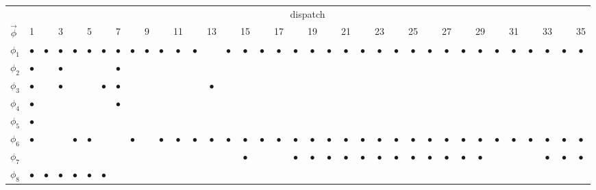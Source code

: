 {\renewcommand{\arraystretch}{0.8} \renewcommand{\tabcolsep}{0.05cm} 
\begin{tabularx}{.9\columnwidth}{|X|ccccccccccccccccccccccccccccccccccc|}
\hline\hline
  & \multicolumn{35}{c|}{dispatch} \\ 
$\vec{\phi} $ & 1 & & 3 &  & 5  &  & 7 &  & 9 &   &11 & &13 & & 15  & &17 & &19 &   &21 & &23 & &25 & &27 & &29 &   &31 & &33 & & 35 \\ \hline 
$\phi_1$& $\bullet$ & $\bullet$ & $\bullet$ & $\bullet$ & $\bullet$ & $\bullet$ & $\bullet$ & $\bullet$ & $\bullet$ & $\bullet$ & $\bullet$ & $\bullet$ &   & $\bullet$ & $\bullet$ & $\bullet$ & $\bullet$ & $\bullet$ & $\bullet$ & $\bullet$ & $\bullet$ & $\bullet$ & $\bullet$ & $\bullet$ & $\bullet$ & $\bullet$ & $\bullet$ & $\bullet$ & $\bullet$ & $\bullet$ & $\bullet$ & $\bullet$ & $\bullet$ & $\bullet$ & $\bullet$ \\
$\phi_2$ & $\bullet$ &   & $\bullet$ &   &   &   & $\bullet$ &   &   &   &   &   &   &   &   &   &   &   &   &   &   &   &   &   &   &   &   &   &   &   &   &   &   &   &   \\
$\phi_3$ & $\bullet$ &   & $\bullet$ &   &   & $\bullet$ & $\bullet$ &   &   &   &   &   & $\bullet$ &   &   &   &   &   &   &   &   &   &   &   &   &   &   &   &   &   &   &   &   &   &  \\
$\phi_4$ & $\bullet$ &   &   &   &   &   & $\bullet$ &   &   &   &   &   &   &   &   &   &   &   &   &   &   &   &   &   &   &   &   &   &   &   &   &   &   &   &  \\
$\phi_5$ & $\bullet$ &   &   &   &   &   &   &   &   &   &   &   &   &   &   &   &   &   &   &   &   &   &   &   &   &   &   &   &   &   &   &   &   &   &  \\
$\phi_6$ & $\bullet$ &   &   & $\bullet$ & $\bullet$ &   &   & $\bullet$ &   & $\bullet$ & $\bullet$ & $\bullet$ & $\bullet$ & $\bullet$ & $\bullet$ & $\bullet$ & $\bullet$ & $\bullet$ & $\bullet$ & $\bullet$ & $\bullet$ & $\bullet$ & $\bullet$ & $\bullet$ & $\bullet$ & $\bullet$ & $\bullet$ & $\bullet$ & $\bullet$ & $\bullet$ & $\bullet$ & $\bullet$ & $\bullet$ & $\bullet$ & $\bullet$ \\
$\phi_7$ &   &   &   &   &   &   &   &   &   &   &   &   &   &   & $\bullet$ &   &   & $\bullet$ & $\bullet$ & $\bullet$ & $\bullet$ & $\bullet$ & $\bullet$ & $\bullet$ & $\bullet$ & $\bullet$ & $\bullet$ & $\bullet$ & $\bullet$ &   &   &   & $\bullet$ & $\bullet$ & $\bullet$\\
$\phi_8$ & $\bullet$ & $\bullet$ & $\bullet$ & $\bullet$ & $\bullet$ & $\bullet$ &   &   &   &   &   &   &   &   &   &   &   &   &   &   &   &   &   &   &   &   &   &   &   &   &   &   &   &   &  \\

\end{tabularx}}
